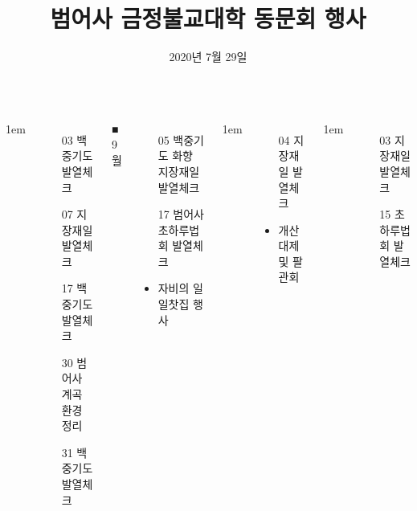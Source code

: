 \documentclass[	17pt, 
							a2paper, 
							portrait, %
							margin=0mm, %
							innermargin=10mm,  		%
							blockverticalspace=4mm, %
							colspace=5mm, 
							subcolspace=0mm
							]{tikzposter}
\title{범어사 금정불교대학 동문회 행사  }
\author{ 2020년 7월 29일 }
\begin{document}
	\maketitle[
					width=420mm,
					linewidth = 2mm,
					innersep=4mm,
					titletoblockverticalspace=2mm, %
					titletextscale =4, 
				]



	\begin{columns}


			{
					\setlength{\leftmargini}{5em}
					\setlength{\labelsep} {1em}
					\begin{itemize}
					\item [03] 백중기도 발열체크
					\item [07] 지장재일 발열체크
					\item [17]	백중기도 발열체크
					\item [30]	범어사 계곡 환경 정리
					\item [31]	백중기도 발열체크
					\end{itemize}
			}

			\block
			{■  9월  }
			{
					\begin{itemize}
					\item [05] 	백중기도 화향 지장재일 발열체크
					\item [17]	범어사 초하루법회 발열체크
					\item 자비의 일일찻집 행사 
					\end{itemize}
			}

			{
					\setlength{\leftmargini}{5em}
					\setlength{\labelsep} {1em}
					\begin{itemize}
					\item [04] 	지장재일 발열체크
					\item 	개산대제 및 팔관회
					\end{itemize}
			}


			{
					\setlength{\leftmargini}{5em}
					\setlength{\labelsep} {1em}
					\begin{itemize}
					\item [03] 	지장재일 발열체크
					\item [15] 	초하루법회 발열체크
					\end{itemize}
			}


\end{columns}
\end{document}
